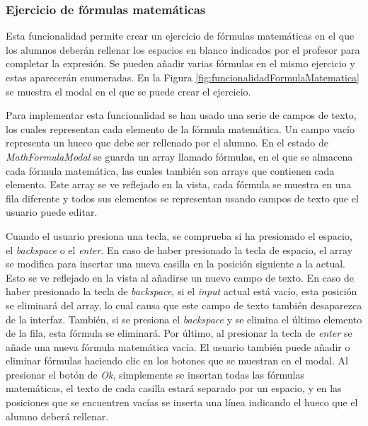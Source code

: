 \subsubsection{Ejercicio de fórmulas matemáticas}
\label{sec:impmatematica}
Esta funcionalidad permite crear un ejercicio de fórmulas matemáticas en el que los alumnos deberán rellenar los espacios en blanco indicados por el profesor para completar la expresión. Se pueden añadir varias fórmulas en el mismo ejercicio y estas aparecerán enumeradas. En la Figura \ref{fig:funcionalidadFormulaMatematica} se muestra el modal en el que se puede crear el ejercicio.

Para implementar esta funcionalidad se han usado una serie de campos de texto, los cuales representan cada elemento de la fórmula matemática. Un campo vacío representa un hueco que debe ser rellenado por el alumno. En el estado de \textit{MathFormulaModal} se guarda un array llamado fórmulas, en el que se almacena cada fórmula matemática, las cuales también son arrays que contienen cada elemento. Este array se ve reflejado en la vista, cada fórmula se muestra en una fila diferente y todos sus elementos se representan usando campos de texto que el usuario puede editar.

Cuando el usuario presiona una tecla, se comprueba si ha presionado el espacio, el \textit{backspace} o el \textit{enter}. En caso de haber presionado la tecla de espacio, el array se modifica para insertar una nueva casilla en la posición siguiente a la actual. Esto se ve reflejado en la vista al añadirse un nuevo campo de texto. En caso de haber presionado la tecla de \textit{backspace}, si el \textit{input} actual está vacío, esta posición se eliminará del array, lo cual causa que este campo de texto también desaparezca de la interfaz. También, si se presiona el \textit{backspace} y se elimina el último elemento de la fila, esta fórmula se eliminará. Por último, al presionar la tecla de \textit{enter} se añade una nueva fórmula matemática vacía. El usuario también puede añadir o eliminar fórmulas haciendo clic en los botones que se muestran en el modal.
Al presionar el botón de \textit{Ok}, simplemente se insertan todas las fórmulas matemáticas, el texto de cada casilla estará separado por un espacio, y en las posiciones que se encuentren vacías se inserta una línea indicando el hueco que el alumno deberá rellenar.


